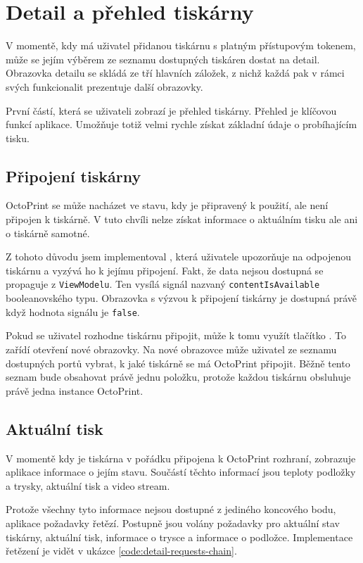 \section{Detail a přehled tiskárny}

V momentě, kdy má uživatel přidanou tiskárnu s platným přístupovým tokenem, může se jejím výběrem ze seznamu dostupných tiskáren dostat na detail.
Obrazovka detailu se skládá ze tří hlavních záložek, z nichž každá pak v rámci svých funkcionalit prezentuje další obrazovky.

První částí, která se uživateli zobrazí je přehled tiskárny.
Přehled je klíčovou funkcí aplikace.
Umožňuje totiž velmi rychle získat základní údaje o probíhajícím tisku.

\subsection{Připojení tiskárny}

OctoPrint se může nacházet ve stavu, kdy je připravený k použití, ale není připojen k tiskárně.
V tuto chvíli nelze získat informace o aktuálním tisku ale ani o tiskárně samotné.

Z tohoto důvodu jsem implementoval , která uživatele upozorňuje na odpojenou tiskárnu a vyzývá ho k jejímu připojení.
Fakt, že data nejsou dostupná se propaguje z \texttt{ViewModelu}.
Ten vysílá signál nazvaný \texttt{contentIsAvailable} booleanovského typu.
Obrazovka s výzvou k připojení tiskárny je dostupná právě když hodnota signálu je \texttt{false}.

Pokud se uživatel rozhodne tiskárnu připojit, může k tomu využít tlačítko .
To zařídí otevření nové obrazovky.
Na nové obrazovce může uživatel ze seznamu dostupných portů vybrat, k jaké tiskárně se má OctoPrint připojit.
Běžně tento seznam bude obsahovat právě jednu položku, protože každou tiskárnu obsluhuje právě jedna instance OctoPrint.

\subsection{Aktuální tisk}

V momentě kdy je tiskárna v pořádku připojena k OctoPrint rozhraní, zobrazuje aplikace informace o jejím stavu.
Součástí těchto informací jsou teploty podložky a trysky, aktuální tisk a video stream.

Protože všechny tyto informace nejsou dostupné z jediného koncového bodu, aplikace požadavky řetězí.
Postupně jsou volány požadavky pro aktuální stav tiskárny, aktuální tisk, informace o trysce a informace o podložce.
Implementace řetězení je vidět v ukázce \ref{code:detail-requests-chain}.

